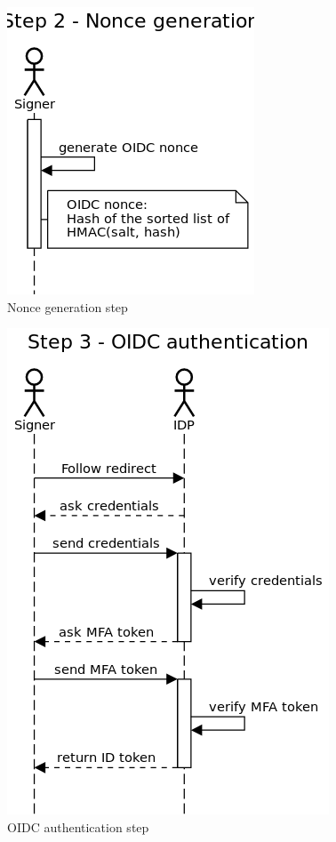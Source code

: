 \begin{figure}
    \begin{center}
        \includegraphics[scale=0.5]{images/protocol_step2_nonce_generation.png}
        \caption{Nonce generation step}
        \label{fig:noncegenerationstep}
    \end{center}
\end{figure}

\begin{figure}
    \begin{center}
        \includegraphics[scale=0.5]{images/protocol_step3_oidc_authentication.png}
        \caption{OIDC authentication step}
        \label{fig:oidcauthenticationstep}
    \end{center}
\end{figure}

